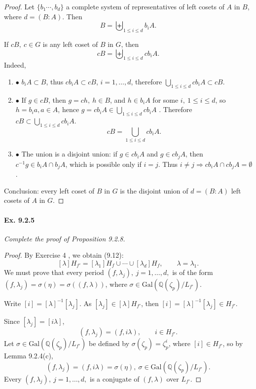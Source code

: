 \documentclass[11pt,a4paper]{article}
\newcommand{\be} {\begin{enumerate}}
\newcommand{\ee} {\end{enumerate}}
\newcommand{\Q}{\mathbb{Q}}
\newcommand{\Gal}{\mathrm{Gal}}
\begin{document}
\begin{proof}
Let $\{b_1\cdots,b_d\}$ a complete system of representatives of left cosets of $A$ in $B$, where $d=(B:A)$. Then
$$B = \biguplus_{1\leq i \leq d} b_i A.$$

If $cB,\ c\in G$ is any left coset of $B$ in $G$, then
$$cB = \biguplus_{1\leq i \leq d} c b_i A.$$
Indeed, 
\be
\item[$\bullet$] $b_i A \subset B$, thus $cb_iA \subset cB$, $i=1,\ldots,d$, therefore $\bigcup_{1\leq i \leq d} c b_i A \subset cB$.

\item[$\bullet$] If $g \in cB$, then $g = ch,\ h\in B$, and $h \in  b_i A$ for some $i, \ 1\leq i \leq d$, so $h= b_ia, a\in A$, hence $g = cb_i A \in \bigcup_{1\leq i \leq d} c b_i A$ . Therefore $cB \subset \bigcup_{1\leq i \leq d} c b_i A$.
$$cB = \bigcup_{1\leq i \leq d} c b_i A.$$
\item[$\bullet$] The union is a disjoint union: if $g \in cb_iA$ and $g\in cb_jA$, then $c^{-1}g \in b_iA\cap b_jA$, which is possible only if $i=j$. Thus $i\neq j \Rightarrow cb_iA\cap cb_jA = \emptyset$.
\ee
Conclusion: every left coset of $B$ in $G$ is the disjoint union of $d = (B:A)$ left cosets of $A$ in $G$.
\end{proof}

\paragraph{Ex. 9.2.5}

{\it Complete the proof of Proposition 9.2.8.
}

\begin{proof}

By Exercise 4 , we obtain (9.12):
$$[\lambda]H_{f'} = [\lambda_1]H_f\cup\cdots \cup[\lambda_d]H_f, \qquad \lambda = \lambda_1.$$
We must prove that every period $(f,\lambda_j),\ j=1,\ldots,d,$ is of the form  $(f,\lambda_j) = \sigma(\eta) = \sigma((f,\lambda))$, where $\sigma \in \Gal(\Q(\zeta_p)/L_{f'})$.

Write $[i] = [\lambda]^{-1} [\lambda_j]$.  As  $[\lambda_j]\in [\lambda] H_{f'}$, then  $[i] = [\lambda]^{-1} [\lambda_j ]\in H_{f'}$. 

Since $[\lambda_j ]= [ i \lambda] $,
 $$(f,\lambda_j) = (f,i\lambda), \qquad i\in H_{f'}.$$ 
Let $\sigma \in \Gal(\Q(\zeta_p)/L_{f'})$ be defined by $\sigma(\zeta_p) = \zeta_p^i$, where $ [i] \in H_{f'}$, so by Lemma 9.2.4(c),
$$(f,\lambda_j) = (f,i\lambda) = \sigma(\eta),\ \sigma \in  \Gal(\Q(\zeta_p)/L_{f'}).$$
Every $(f,\lambda_j),\ j=1,\ldots,d,$ is a conjugate of $(f,\lambda)$ over $L_{f'}$.
\end{proof}
\end{document}
